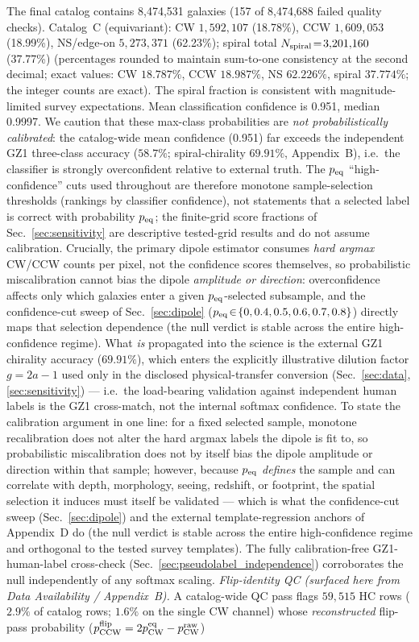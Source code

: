 \documentclass[aps,prd,twocolumn,superscriptaddress,preprintnumbers,nofootinbib,longbibliography,floatfix]{revtex4-2}
\begin{document}
The final catalog contains 8,474,531 galaxies (157 of 8,474,688 failed quality checks). Catalog~C (equivariant): CW $1{,}592{,}107$ (18.78\%), CCW $1{,}609{,}053$ (18.99\%), NS/edge-on $5{,}273{,}371$ (62.23\%); spiral total $N_{\rm spiral}\!=\!3{,}201{,}160$ (37.77\%) (percentages rounded to maintain sum-to-one consistency at the second decimal; exact values: CW $18.787\%$, CCW $18.987\%$, NS $62.226\%$, spiral $37.774\%$; the integer counts are exact). The spiral fraction is consistent with magnitude-limited survey expectations. Mean classification confidence is 0.951, median 0.9997. We caution that these max-class probabilities are \emph{not probabilistically calibrated}: the catalog-wide mean confidence (0.951) far exceeds the independent GZ1 three-class accuracy ($58.7\%$; spiral-chirality $69.91\%$, Appendix~B), i.e.\ the classifier is strongly overconfident relative to external truth. The $p_{\rm eq}$ ``high-confidence'' cuts used throughout are therefore monotone sample-selection thresholds (rankings by classifier confidence), not statements that a selected label is correct with probability $p_{\rm eq}$; the finite-grid score fractions of Sec.~\ref{sec:sensitivity} are descriptive tested-grid results and do not assume calibration. Crucially, the primary dipole estimator consumes \emph{hard argmax} CW/CCW counts per pixel, not the confidence scores themselves, so probabilistic miscalibration cannot bias the dipole \emph{amplitude or direction}: overconfidence affects only which galaxies enter a given $p_{\rm eq}$-selected subsample, and the confidence-cut sweep of Sec.~\ref{sec:dipole} ($p_{\rm eq}\!\in\!\{0,0.4,0.5,0.6,0.7,0.8\}$) directly maps that selection dependence (the null verdict is stable across the entire high-confidence regime). What \emph{is} propagated into the science is the external GZ1 chirality accuracy ($69.91\%$), which enters the explicitly illustrative dilution factor $g=2a-1$ used only in the disclosed physical-transfer conversion (Sec.~\ref{sec:data}, \ref{sec:sensitivity}) --- i.e.\ the load-bearing validation against independent human labels is the GZ1 cross-match, not the internal softmax confidence. To state the calibration argument in one line: for a fixed selected sample, monotone recalibration does not alter the hard argmax labels the dipole is fit to, so probabilistic miscalibration does not by itself bias the dipole amplitude or direction within that sample; however, because $p_{\rm eq}$ \emph{defines} the sample and can correlate with depth, morphology, seeing, redshift, or footprint, the spatial selection it induces must itself be validated --- which is what the confidence-cut sweep (Sec.~\ref{sec:dipole}) and the external template-regression anchors of Appendix~D do (the null verdict is stable across the entire high-confidence regime and orthogonal to the tested survey templates). The fully calibration-free GZ1-human-label cross-check (Sec.~\ref{sec:pseudolabel_independence}) corroborates the null independently of any softmax scaling. \emph{Flip-identity QC (surfaced here from Data Availability / Appendix~B).} A catalog-wide QC pass flags $59{,}515$ HC rows ($2.9\%$ of catalog rows; $1.6\%$ on the single CW channel) whose \emph{reconstructed} flip-pass probability ($p_{\rm CCW}^{\rm flip}=2p_{\rm CW}^{\rm eq}-p_{\rm CW}^{\rm raw}$) 
\end{document}
